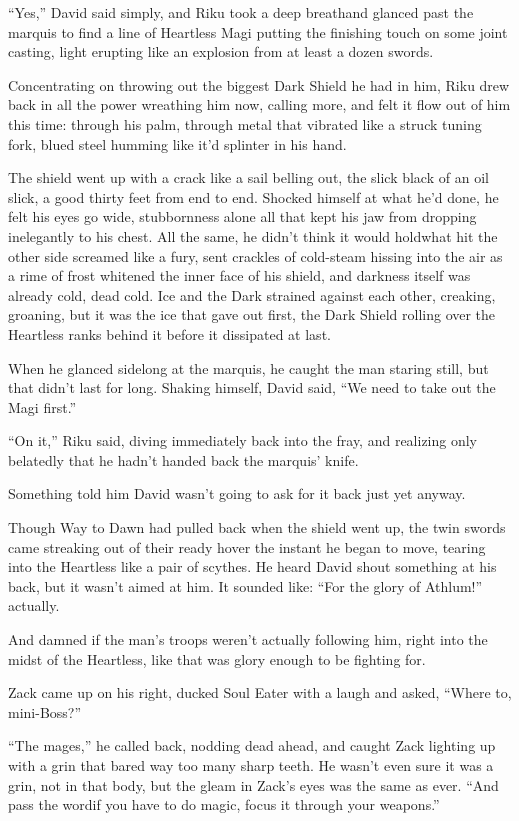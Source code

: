 ``Yes,'' David said simply, and Riku took a deep breath\textemdash and glanced past the marquis to find a line of Heartless Magi putting the finishing touch on some joint casting, light erupting like an explosion from at least a dozen swords.

Concentrating on throwing out the biggest Dark Shield he had in him, Riku drew back in all the power wreathing him now, calling more, and felt it flow out of him this time: through his palm, through metal that vibrated like a struck tuning fork, blued steel humming like it'd splinter in his hand.

The shield went up with a crack like a sail belling out, the slick black of an oil slick, a good thirty feet from end to end. Shocked himself at what he'd done, he felt his eyes go wide, stubbornness alone all that kept his jaw from dropping inelegantly to his chest. All the same, he didn't think it would hold\textemdash what hit the other side screamed like a fury, sent crackles of cold-steam hissing into the air as a rime of frost whitened the inner face of his shield, and darkness itself was already cold, dead cold. Ice and the Dark strained against each other, creaking, groaning, but it was the ice that gave out first, the Dark Shield rolling over the Heartless ranks behind it before it dissipated at last.

When he glanced sidelong at the marquis, he caught the man staring still, but that didn't last for long. Shaking himself, David said, ``We need to take out the Magi first.''

``On it,'' Riku said, diving immediately back into the fray, and realizing only belatedly that he hadn't handed back the marquis' knife.

Something told him David wasn't going to ask for it back just yet anyway.

Though Way to Dawn had pulled back when the shield went up, the twin swords came streaking out of their ready hover the instant he began to move, tearing into the Heartless like a pair of scythes. He heard David shout something at his back, but it wasn't aimed at him. It sounded like: ``For the glory of Athlum!'' actually.

And damned if the man's troops weren't actually following him, right into the midst of the Heartless, like that was glory enough to be fighting for.

Zack came up on his right, ducked Soul Eater with a laugh and asked, ``Where to, mini-Boss?''

``The mages,'' he called back, nodding dead ahead, and caught Zack lighting up with a grin that bared way too many sharp teeth. He wasn't even sure it was a grin, not in that body, but the gleam in Zack's eyes was the same as ever. ``And pass the word\textemdash if you have to do magic, focus it through your weapons.''

